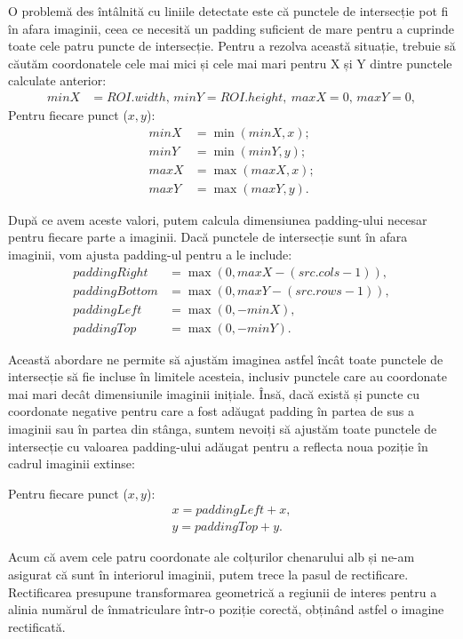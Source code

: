 \documentclass[a4paper,12pt]{report}
\begin{document}
O problemă des întâlnită cu liniile detectate este că punctele de intersecție pot fi în afara imaginii, ceea ce necesită un padding suficient de mare pentru a cuprinde toate cele patru puncte de intersecție. Pentru a rezolva această situație, trebuie să căutăm coordonatele cele mai mici și cele mai mari pentru X și Y dintre punctele calculate anterior:
\[
    \begin{aligned}
        minX & = ROI.width, \, minY = ROI.height, \ maxX = 0, \, maxY = 0,
    \end{aligned}
\]
Pentru fiecare punct (\(x, y\)):
\[
    \begin{aligned}
        minX & = \min(minX, x); \\
        minY & = \min(minY, y); \\
        maxX & = \max(maxX, x); \\
        maxY & = \max(maxY, y).
    \end{aligned}
\]

După ce avem aceste valori, putem calcula dimensiunea padding-ului necesar pentru fiecare parte a imaginii. Dacă punctele de intersecție sunt în afara imaginii, vom ajusta padding-ul pentru a le include:
\[
    \begin{aligned}
        paddingRight  & = \max(0, maxX - (src.cols - 1)), \\
        paddingBottom & = \max(0, maxY - (src.rows - 1)), \\
        paddingLeft   & = \max(0, -minX),                 \\
        paddingTop    & = \max(0, -minY).
    \end{aligned}
\]

Această abordare ne permite să ajustăm imaginea astfel încât toate punctele de intersecție să fie incluse în limitele acesteia, inclusiv punctele care au coordonate mai mari decât dimensiunile imaginii inițiale. Însă, dacă există și puncte cu coordonate negative pentru care a fost adăugat padding în partea de sus a imaginii sau în partea din stânga, suntem nevoiți să ajustăm toate punctele de intersecție cu valoarea padding-ului adăugat pentru a reflecta noua poziție în cadrul imaginii extinse:

Pentru fiecare punct (\(x, y\)):
\[
    \begin{aligned}
        x = paddingLeft + x, \\
        y = paddingTop + y.
    \end{aligned}
\]

Acum că avem cele patru coordonate ale colțurilor chenarului alb și ne-am asigurat că sunt în interiorul imaginii, putem trece la pasul de rectificare. Rectificarea presupune transformarea geometrică a regiunii de interes pentru a alinia numărul de înmatriculare într-o poziție corectă, obținând astfel o imagine rectificată.
\end{document}
